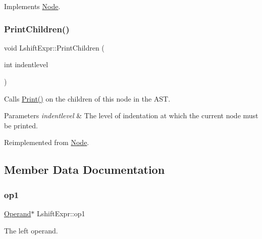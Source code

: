 Implements \hyperlink{class_node_a56e29657306ffb004d69c6929ae44269}{Node}.

\mbox{\label{class_lshift_expr_a01b9cf72d82eeaa4f57ebd87bf20f54b}} 
\subsubsection{\texorpdfstring{Print\+Children()}{PrintChildren()}}
{\footnotesize\ttfamily void Lshift\+Expr\+::\+Print\+Children (\begin{DoxyParamCaption}\item[{int}]{indentlevel }\end{DoxyParamCaption})\hspace{0.3cm}{\ttfamily [virtual]}}

Calls \hyperlink{class_node_a9ef727fd72d1a37792b3db60a8a479dd}{Print()} on the children of this node in the A\+ST. 
\begin{DoxyParams}{Parameters}
{\em indentlevel} & The level of indentation at which the current node must be printed. \\
\hline
\end{DoxyParams}


Reimplemented from \hyperlink{class_node_a3e67ec8d22182b721717af14fe0c3000}{Node}.



\subsection{Member Data Documentation}
\mbox{\label{class_lshift_expr_a09d1f3231f0a2c79349d5e0c1799684b}} 
\subsubsection{\texorpdfstring{op1}{op1}}
{\footnotesize\ttfamily \hyperlink{class_operand}{Operand}$\ast$ Lshift\+Expr\+::op1\hspace{0.3cm}{\ttfamily [protected]}}

The left operand. \mbox{\label{class_lshift_expr_a1822bf673e7eead888ae65c47bd7cd18}} 
